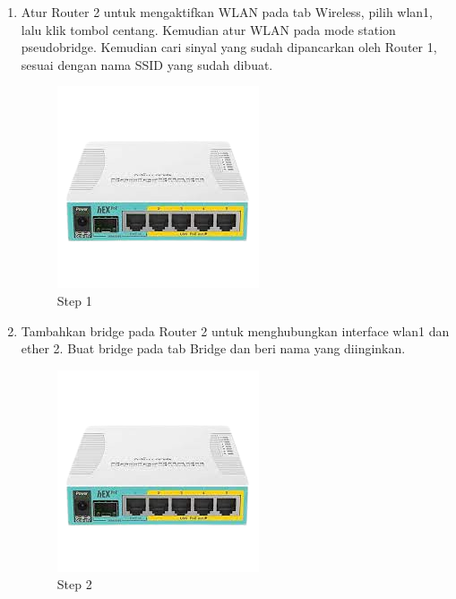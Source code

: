 \begin{enumerate}
	\item Atur Router 2 untuk mengaktifkan WLAN pada tab Wireless, pilih wlan1, lalu klik tombol centang. Kemudian atur WLAN pada mode station pseudobridge. Kemudian cari sinyal yang sudah
	dipancarkan oleh Router 1, sesuai dengan nama SSID yang sudah dibuat.
	\begin{figure}[H]
		\centering
		\includegraphics[width=0.5\linewidth]{P1/img/contoh.png}
		\caption{Step 1}
		\label{fig:gambar24}
	\end{figure}

	\item Tambahkan bridge pada Router 2 untuk menghubungkan interface wlan1 dan ether 2. Buat
	bridge pada tab Bridge dan beri nama yang diinginkan.
	\begin{figure}[H]
		\centering
		\includegraphics[width=0.5\linewidth]{P1/img/contoh.png}
		\caption{Step 2}
		\label{fig:gambar25}
	\end{figure}


\end{enumerate}
